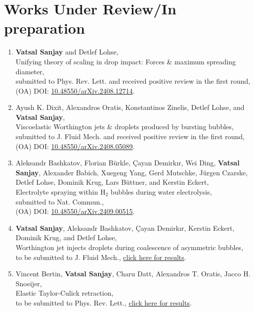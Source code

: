 \documentclass[11pt,a4paper,roman,english,colorlinks,linkcolor={red!50!black}]{moderncv}
\begin{document}
\section{\textbf{Works Under Review/In preparation}}

\begin{enumerate}[leftmargin=0.75cm]
	\item \textbf{Vatsal Sanjay} and Detlef Lohse,\\
	Unifying theory of scaling in drop impact: Forces \& maximum spreading diameter,\\
	submitted to Phys. Rev. Lett. and received positive review in the first round,\\
	(OA) DOI: \href{https://doi.org/10.48550/arXiv.2408.12714}{10.48550/arXiv.2408.12714}.

	\item Ayush K. Dixit, Alexandros Oratis, Konstantinos Zinelis, Detlef Lohse, and \textbf{Vatsal Sanjay},\\
	Viscoelastic Worthington jets \& droplets produced by bursting bubbles,\\
	submitted to J. Fluid Mech. and received positive review in the first round,\\
	(OA) DOI: \href{https://doi.org/10.48550/arXiv.2408.05089}{10.48550/arXiv.2408.05089}.

	\item Aleksandr Bashkatov, Florian Bürkle, Çayan Demirkır, Wei Ding, \textbf{Vatsal Sanjay}, Alexander Babich, Xuegeng Yang, Gerd Mutschke, Jürgen Czarske, Detlef Lohse, Dominik Krug, Lars Büttner, and Kerstin Eckert,\\
	Electrolyte spraying within H$_2$ bubbles during water electrolysis,\\
	submitted to Nat. Commun.,\\
	(OA) DOI: \href{https://doi.org/10.48550/arXiv.2409.00515}{10.48550/arXiv.2409.00515}.

	\item \textbf{Vatsal Sanjay}, Aleksandr Bashkatov, Çayan Demirkır, Kerstin Eckert, Dominik Krug, and Detlef Lohse,\\
	Worthington jet injects droplets during coalescence of asymmetric bubbles,\\
	to be submitted to J. Fluid Mech., \href{https://youtu.be/WZonMHzzkXQ}{click here for results}.

	\item Vincent Bertin, \textbf{Vatsal Sanjay}, Charu Datt, Alexandros T. Oratis, Jacco H. Snoeijer,\\
	Elastic Taylor-Culick retraction,\\
	to be submitted to Phys. Rev. Lett., \href{https://tinyurl.com/2cvo89bd}{click here for results}.


\end{enumerate}
\end{document}
